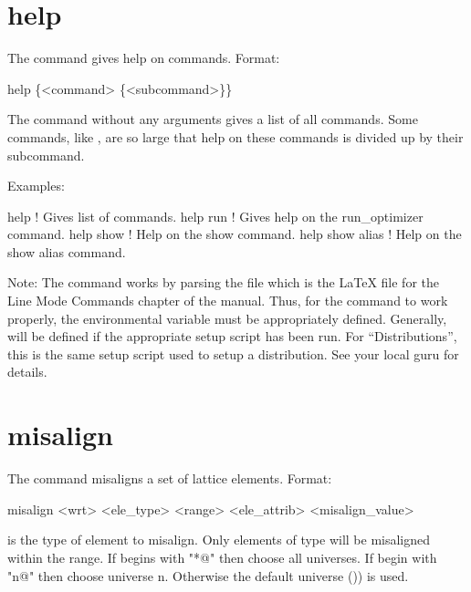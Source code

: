 \section{help}
\label{s:help}

The  command gives help on \tao commands. Format:
\begin{example}
  help \{<command> \{<subcommand>\}\}
\end{example}

\vskip 10pt

The  command without any arguments gives a list of all commands.  Some commands,
like , are so large that help on these commands is divided up by their
subcommand.

Examples:
\begin{example}
  help            ! Gives list of commands.
  help run        ! Gives help on the run_optimizer command.
  help show       ! Help on the show command.
  help show alias ! Help on the show alias command.
\end{example}

Note: The  command works by parsing the file 
which is the LaTeX file for the Line Mode Commands chapter of the \tao manual. Thus, for
the  command to work properly, the environmental variable  must be
appropriately defined. Generally,  will be defined if the appropriate setup
script has been run. For ``Distributions'', this is the same setup script used to setup a
distribution. See your local \bmad guru for details.

\section{misalign}
\label{s:misalign}

The  command misaligns a set of lattice elements. Format:
\begin{example}
   misalign <wrt> <ele_type> <range> <ele_attrib> <misalign_value>
\end{example}

\vskip 10pt 

 is the type of element to misalign.  Only elements of type 
will be misaligned within the range.  If  begins with "*@" then choose all
universes. If  begin with "n@" then choose universe n. Otherwise the
default universe ()) is used.

